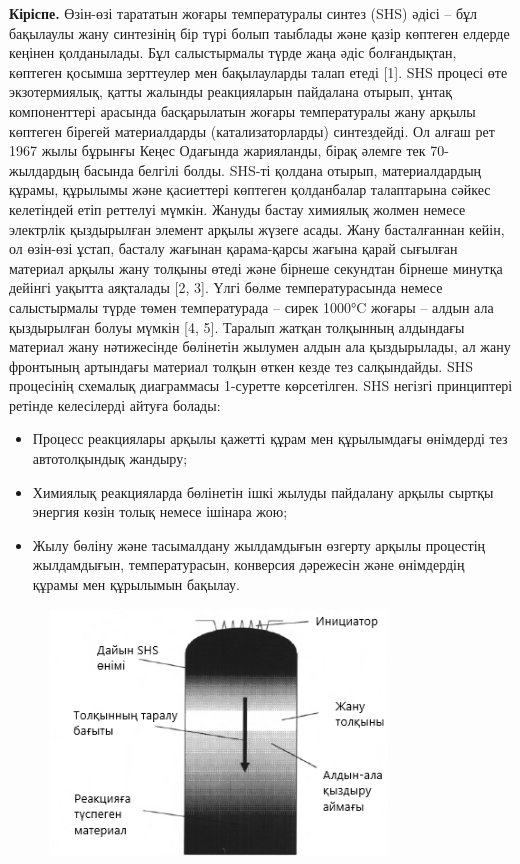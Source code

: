 {\bfseries Кіріспе.} Өзін-өзі тарататын жоғары температуралы синтез (SHS)
әдісі -- бұл бақылаулы жану синтезінің бір түрі болып таыблады және
қазір көптеген елдерде кеңінен қолданылады. Бұл салыстырмалы түрде жаңа
әдіс болғандықтан, көптеген қосымша зерттеулер мен бақылауларды талап
етеді {[}1{]}. SHS процесі өте экзотермиялық, қатты жалынды реакцияларын
пайдалана отырып, ұнтақ компоненттері арасында басқарылатын жоғары
температуралы жану арқылы көптеген бірегей материалдарды
(катализаторларды) синтездейді. Ол алғаш рет 1967 жылы бұрынғы Кеңес
Одағында жарияланды, бірақ әлемге тек 70-жылдардың басында белгілі
болды. SHS-ті қолдана отырып, материалдардың құрамы, құрылымы және
қасиеттері көптеген қолданбалар талаптарына сәйкес келетіндей етіп
реттелуі мүмкін. Жануды бастау химиялық жолмен немесе электрлік
қыздырылған элемент арқылы жүзеге асады. Жану басталғаннан кейін, ол
өзін-өзі ұстап, басталу жағынан қарама-қарсы жағына қарай сығылған
материал арқылы жану толқыны өтеді және бірнеше секундтан бірнеше
минутқа дейінгі уақытта аяқталады {[}2, 3{]}. Үлгі бөлме
температурасында немесе салыстырмалы түрде төмен температурада -- сирек
1000°C жоғары -- алдын ала қыздырылған болуы мүмкін {[}4, 5{]}. Таралып
жатқан толқынның алдындағы материал жану нәтижесінде бөлінетін жылумен
алдын ала қыздырылады, ал жану фронтының артындағы материал толқын өткен
кезде тез салқындайды. SHS процесінің схемалық диаграммасы 1-суретте
көрсетілген. SHS негізгі принциптері ретінде келесілерді айтуға болады:

\begin{itemize}
\item
  Процесс реакциялары арқылы қажетті құрам мен құрылымдағы өнімдерді тез
  автотолқындық жандыру;
\item
  Химиялық реакцияларда бөлінетін ішкі жылуды пайдалану арқылы сыртқы
  энергия көзін толық немесе ішінара жою;
\item
  Жылу бөліну және тасымалдану жылдамдығын өзгерту арқылы процестің
  жылдамдығын, температурасын, конверсия дәрежесін және өнімдердің
  құрамы мен құрылымын бақылау.
\end{itemize}

\begin{figure}[H]
	\centering
	\includegraphics[width=0.8\textwidth]{assets/69}
	\caption*{}
\end{figure}

